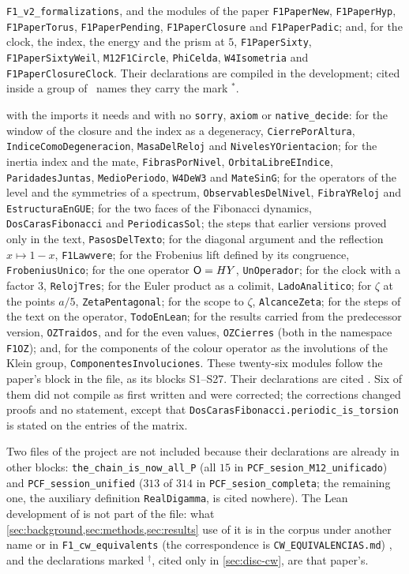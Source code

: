 \begin{description}
    \texttt{F1\_v2\_formalizations}, and the modules of the paper \texttt{F1PaperNew},
    \texttt{F1PaperHyp}, \texttt{F1PaperTorus}, \texttt{F1PaperPending}, \texttt{F1PaperClosure} and \texttt{F1PaperPadic}; and, for the clock, the index, the energy and the prism at $5$, \texttt{F1PaperSixty}, \texttt{F1PaperSixtyWeil}, \texttt{M12F1Circle}, \texttt{PhiCelda}, \texttt{W4Isometria} and \texttt{F1PaperClosureClock}.  Their declarations are compiled in the development; cited inside a
    group of \ names they carry the mark $^{*}$.
  \item[Compiled] with the
    imports it needs and with no \texttt{sorry}, \texttt{axiom} or \texttt{native\_decide}: for the window of the closure and
    the index as a degeneracy, \texttt{CierrePorAltura}, \texttt{IndiceComoDegeneracion}, \texttt{MasaDelReloj} and
    \texttt{NivelesYOrientacion}; for the inertia index and the mate, \texttt{FibrasPorNivel},
    \texttt{OrbitaLibreEIndice}, \texttt{ParidadesJuntas}, \texttt{MedioPeriodo}, \texttt{W4DeW3} and \texttt{MateSinG}; for
    the operators of the level and the symmetries of a spectrum, \texttt{ObservablesDelNivel}, \texttt{FibraYReloj}
    and \texttt{EstructuraEnGUE}; for the two faces of the Fibonacci dynamics, \texttt{DosCarasFibonacci} and
    \texttt{PeriodicasSol}; the steps that earlier versions proved only in the text, \texttt{PasosDelTexto}; for the diagonal argument and the reflection $x\mapsto1-x$, \texttt{F1Lawvere}; for the Frobenius lift defined by its congruence, \texttt{FrobeniusUnico}; for the one operator $\mathsf{O}=HY$, \texttt{UnOperador}; for the clock with a factor $3$, \texttt{RelojTres}; for the Euler product as a colimit, \texttt{LadoAnalitico}; for $\zeta$ at the points $a/5$, \texttt{ZetaPentagonal}; for the scope to $\zeta$, \texttt{AlcanceZeta}; for the steps of the text on the operator, \texttt{TodoEnLean}; for the results carried from the predecessor version, \texttt{OZTraidos}, and for the even values, \texttt{OZCierres} (both in the namespace \texttt{F1OZ}); and, for the components of the colour operator as the involutions of the Klein group, \texttt{ComponentesInvoluciones}.  These twenty-six modules follow the paper's block in the file, as its blocks S1--S27.  Their declarations are cited .  Six of them did not compile as first written and
    were corrected; the corrections changed proofs and no statement, except that
    \texttt{DosCarasFibonacci.periodic\_is\_torsion} is stated on the entries of the matrix.
\end{description}
Two files of the project are not included because their declarations are already in
other blocks: \texttt{the\_chain\_is\_now\_all\_P} (all $15$ in
\texttt{PCF\_sesion\_M12\_unificado}) and \texttt{PCF\_session\_unified} ($313$ of $314$
in \texttt{PCF\_sesion\_completa}; the remaining one, the auxiliary definition
\texttt{RealDigamma}, is cited nowhere).  The Lean development of \cite{gonzalez26cw}
is not part of the file: what \cref{sec:background,sec:methods,sec:results} use of it is in the corpus under another name
or in \texttt{F1\_cw\_equivalents} (the correspondence is \texttt{CW\_EQUIVALENCIAS.md})
,
and the declarations marked $^{\dagger}$, cited only in \cref{sec:disc-cw}, are that
paper's.

